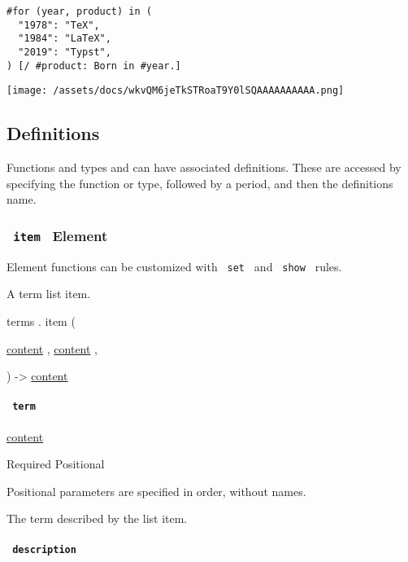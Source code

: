 \begin{verbatim}
#for (year, product) in (
  "1978": "TeX",
  "1984": "LaTeX",
  "2019": "Typst",
) [/ #product: Born in #year.]
\end{verbatim}

\texttt{[image: /assets/docs/wkvQM6jeTkSTRoaT9Y0lSQAAAAAAAAAA.png]}

\subsection{\texorpdfstring{{ Definitions
}}{ Definitions }}\label{definitions}

\label{definitions-tooltip}
Functions and types and can have associated definitions. These are
accessed by specifying the function or type, followed by a period, and
then the definition\textquotesingle s name.

\subsubsection{\texorpdfstring{\texttt{\ item\ } {{ Element
}}}{ item   Element }}\label{definitions-item}

\label{definitions-item-element-tooltip}
Element functions can be customized with \texttt{\ set\ } and
\texttt{\ show\ } rules.

A term list item.

terms { . } { item } (

{ \href{/docs/reference/foundations/content/}{content} , } {
\href{/docs/reference/foundations/content/}{content} , }

) -\textgreater{} \href{/docs/reference/foundations/content/}{content}

\paragraph{\texorpdfstring{\texttt{\ term\ }}{ term }}\label{definitions-item-term}

\href{/docs/reference/foundations/content/}{content}

{Required} {{ Positional }}

\label{definitions-item-term-positional-tooltip}
Positional parameters are specified in order, without names.

The term described by the list item.

\paragraph{\texorpdfstring{\texttt{\ description\ }}{ description }}\label{definitions-item-description}

